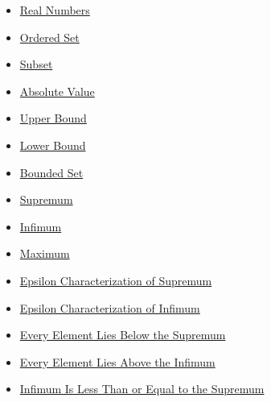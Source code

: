 \begin{dependencies}
\begin{itemize}
  \item \hyperref[def:reals]{Real Numbers}
  \item \hyperref[def:ordered-set]{Ordered Set}
  \item \hyperref[def:subset]{Subset}
  \item \hyperref[def:absolute-value]{Absolute Value}
  \item \hyperref[def:real-upper-bound]{Upper Bound}
  \item \hyperref[def:real-lower-bound]{Lower Bound}
  \item \hyperref[def:bounded]{Bounded Set}
  \item \hyperref[def:supremum]{Supremum}
  \item \hyperref[def:infimum]{Infimum}
  \item \hyperref[def:maximum]{Maximum}
  \item \hyperref[def:epsilon-characterization-of-supremum]{Epsilon Characterization of Supremum}
  \item \hyperref[def:epsilon-characterization-of-infimum]{Epsilon Characterization of Infimum}
  \item \hyperref[prop:every-element-lies-below-the-supremum]{Every Element Lies Below the Supremum}
  \item \hyperref[prop:every-element-lies-above-the-infimum]{Every Element Lies Above the Infimum}
  \item \hyperref[thm:infimum-less-than-supremum]{Infimum Is Less Than or Equal to the Supremum}
\end{itemize}
\end{dependencies}




